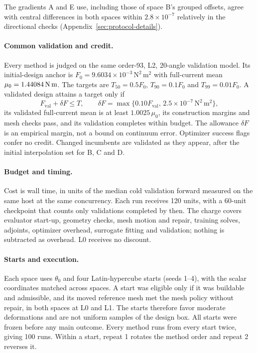 The gradients A and E use, including those of space B's grouped offsets,
agree with central differences in both spaces within $2.8\times10^{-7}$
relatively in the directional checks (Appendix~\ref{sec:protocol-details}).

\paragraph{Common validation and credit.}
Every method is judged on the same order-93, L2, 20-angle validation model.
Its initial-design anchor is $F_0=9.6034\times10^{-3}\,\mathrm{N^2\,m^2}$ with
full-current mean $\mu_0=1.44084\,\mathrm{N\,m}$. The targets are $T_{50}=0.5F_0$,
$T_{90}=0.1F_0$ and $T_{99}=0.01F_0$. A validated design attains a target
only if
\begin{equation}
 F_{\mathrm{val}}+\delta F\leq T,\qquad
 \delta F=\max\{0.10F_{\mathrm{val}},\,2.5\times10^{-7}\,\mathrm{N^2\,m^2}\},
\end{equation}
its validated full-current mean is at least $1.0025\,\mu_0$, its
construction margins and mesh checks pass, and its validation completes
within budget. The allowance $\delta F$ is an empirical margin, not a bound
on continuum error. Optimizer success flags confer no credit. Changed
incumbents are validated as they appear, after the initial interpolation
set for B, C and D.

\paragraph{Budget and timing.}
Cost is wall time, in units of the median cold validation forward measured
on the same host at the same concurrency. Each run receives 120 units,
with a 60-unit checkpoint that counts only validations completed by then.
The charge covers evaluator start-up, geometry checks, mesh motion and
repair, training solves, adjoints, optimizer overhead, surrogate fitting
and validation; nothing is subtracted as overhead. L0 receives no discount.

\paragraph{Starts and execution.}
Each space uses $\theta_0$ and four Latin-hypercube starts (seeds 1--4),
with the scalar coordinates matched across spaces. A start was eligible
only if it was buildable and admissible, and its moved reference mesh met
the mesh policy without repair, in both spaces at L0 and L1. The starts
therefore favor moderate deformations and are not uniform samples of the
design box. All starts were frozen before any main outcome. Every method
runs from every start twice, giving 100 runs. Within a start, repeat 1
rotates the method order and repeat 2 reverses it.

